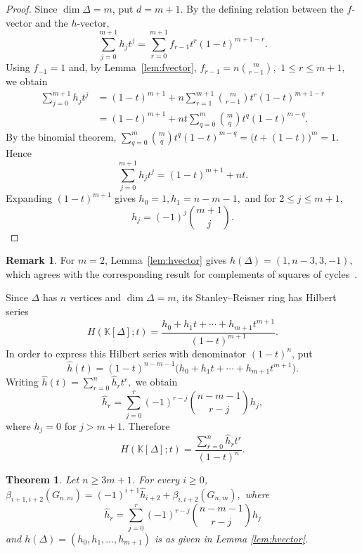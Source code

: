 \documentclass[12pt,reqno]{amsart}
\newtheorem{theorem}{Theorem}[section]
\theoremstyle{definition}
\newtheorem{remark}{Remark}
\numberwithin{equation}{section}
\def\K{\mathbb{K}}
\begin{document}
\begin{proof}
	Since $\dim\Delta=m$, put \( d=m+1. \)
	By the defining relation between the $f$-vector and the $h$-vector,
	\[
	\sum_{j=0}^{m+1}h_jt^j
	=
	\sum_{r=0}^{m+1}
	f_{r-1}t^r(1-t)^{m+1-r}.
	\]
	Using \( f_{-1}=1 \) and, by Lemma~\ref{lem:fvector}, \( f_{r-1}=n\binom{m}{r-1}, \) \( 1\leq r\leq m+1, \)
	we obtain
	\[
	\begin{aligned}
		\sum_{j=0}^{m+1}h_jt^j
		&=
		(1-t)^{m+1}
		+
		n\sum_{r=1}^{m+1}
		\binom{m}{r-1}t^r(1-t)^{m+1-r}\\
		&=
		(1-t)^{m+1}
		+
		nt\sum_{q=0}^{m}
		\binom{m}{q}t^q(1-t)^{m-q}.
	\end{aligned}
	\]
	By the binomial theorem, \( 	\sum_{q=0}^{m}
	\binom{m}{q}t^q(1-t)^{m-q}
	=
	\bigl(t+(1-t)\bigr)^m
	=
	1. \)
	Hence
	\[
	\sum_{j=0}^{m+1}h_jt^j
	=
	(1-t)^{m+1}+nt.
	\]
	Expanding $(1-t)^{m+1}$ gives
\( h_0=1, h_1=n-m-1, \)
	and for \( 2\leq j\leq m+1 \),
	\[
	h_j=(-1)^j\binom{m+1}{j}.
	\]
\end{proof}

\begin{remark}
For $m=2$, Lemma~\ref{lem:hvector} gives \( h(\Delta)=(1,n-3,3,-1), \)
which agrees with the corresponding result for complements of squares
of cycles~\cite{RatherSquare}.
\end{remark}

Since $\Delta$ has $n$ vertices and $\dim\Delta=m$,
its Stanley--Reisner ring has Hilbert series
\[
H(\K[\Delta];t)
=
\frac{h_0+h_1t+\cdots+h_{m+1}t^{m+1}}
{(1-t)^{m+1}}.
\]
In order to express this Hilbert series with denominator $(1-t)^n$, put
\[
\widehat h(t)
=
(1-t)^{n-m-1}
\big(h_0+h_1t+\cdots+h_{m+1}t^{m+1}\big).
\]
Writing \( \widehat h(t)
=
\sum_{r=0}^{n}\widehat h_rt^r, \)
we obtain
\[
\widehat h_r
=
\sum_{j=0}^{r}
(-1)^{r-j}
\binom{n-m-1}{r-j}h_j,
\]
where $h_j=0$ for $j>m+1$. Therefore
\[
H(\K[\Delta];t)
=
\frac{\sum_{r=0}^{n}\widehat h_rt^r}{(1-t)^n}.
\]

\begin{theorem}\label{thm:linear}
	Let $n\geq3m+1$. For every $i\geq0$, \( \beta_{i+1,i+2}(G_{n,m})
	=
	(-1)^{i+1}\widehat h_{i+2}
	+
	\beta_{i,i+2}(G_{n,m}), \)
	where
	\[
	\widehat h_r
	=
	\sum_{j=0}^{r}
	(-1)^{r-j}
	\binom{n-m-1}{r-j}h_j
	\]
	and \( h(\Delta)=(h_0,h_1,\ldots,h_{m+1}) \)
	is as given in Lemma \ref{lem:hvector}.
\end{theorem}
\end{document}
